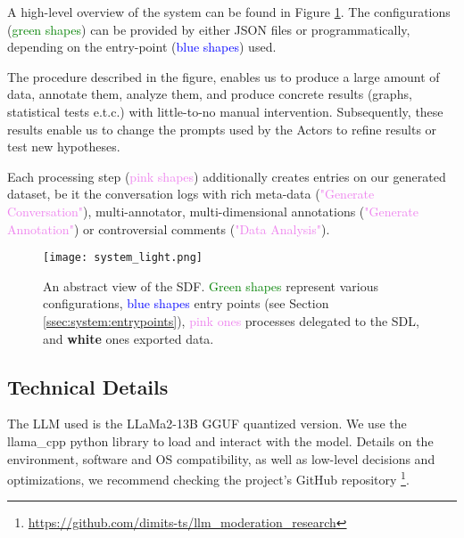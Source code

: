 A high-level overview of the system can be found in Figure \ref{fig::system}. The configurations (\textcolor{green}{green shapes}) can be provided by either JSON files or programmatically, depending on the entry-point (\textcolor{blue}{blue shapes}) used. 

The procedure described in the figure, enables us to produce a large amount of data, annotate them, analyze them, and produce concrete results (graphs, statistical tests e.t.c.) with little-to-no manual intervention. Subsequently, these results enable us to change the prompts used by the Actors to refine results or test new hypotheses.

Each processing step (\textcolor{violet}{pink shapes}) additionally creates entries on our generated dataset, be it the conversation logs with rich meta-data (\textcolor{violet}{"Generate Conversation"}), multi-annotator, multi-dimensional annotations (\textcolor{violet}{"Generate Annotation"}) or controversial comments (\textcolor{violet}{"Data Analysis"}).

\begin{figure}
	\centering
	\texttt{[image: system\_light.png]}
	\caption{An abstract view of the SDF. \textcolor{green}{Green shapes} represent various configurations, \textcolor{blue}{blue shapes} entry points (see Section \ref{ssec:system:entrypoints}), \textcolor{violet}{pink ones} processes delegated to the SDL, and \textbf{white} ones exported data.}
	\label{fig::system}
\end{figure}



\subsection{Technical Details}
\label{ssec:system:details}

The LLM used is the LLaMa2-13B GGUF quantized version. We use the llama\_cpp python library to load and interact with the model. Details on the environment, software and OS compatibility, as well as low-level decisions and optimizations, we recommend checking the project's GitHub repository \footnote{\url{https://github.com/dimits-ts/llm_moderation_research}}.

